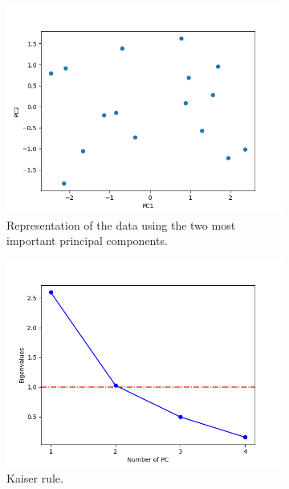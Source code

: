 \documentclass[11pt,a4paper]{article}
\begin{document}
\begin{figure}[H]
  \centering
  \begin{subfigure}[t]{.5\textwidth}
    \centering
    \includegraphics[scale=0.4]{img/pc_correlation}
    \caption{Representation of the data using the two most important principal components.}
  \end{subfigure}%
  \begin{subfigure}[t]{.5\textwidth}
    \centering
    \includegraphics[scale=0.4]{img/pc_correlation_kaiser}
    \caption{Kaiser rule.}
  \end{subfigure}
  \begin{subfigure}[t]{.5\textwidth}
    \centering

\end{subfigure}
\end{figure}
\end{document}
